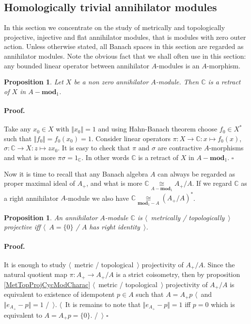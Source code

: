 \documentclass[12pt]{article}
\newcommand{\isom}[1]{\mathop{\mathbin{\cong}}\limits_{#1}}
\newtheorem{proposition}[theorem]{Proposition}
\renewenvironment{proof}{\paragraph{Proof.}}{\hfill$\square$\medskip}
\begin{document}
\subsection{Homologically trivial annihilator modules}
\label{SubSectionHomoligicallyTrivialAnnihilatorModules}

In this section we concentrate on the study of metrically and topologically projective, injective and flat annihilator modules, that is modules with zero outer action. Unless otherwise stated, all Banach spaces in this section are regarded as annihilator modules. Note the obvious fact that we shall often use in this section: any bounded linear operator between annihilator $A$-modules is an $A$-morphism.

\begin{proposition}\label{AnnihCModIsRetAnnihMod} Let $X$ be a non zero annihilator $A$-module. Then $\mathbb{C}$ is a retract of $X$ in $A-\mathbf{mod}_1$.
\end{proposition}
\begin{proof} Take any $x_0\in X$ with $\Vert x_0\Vert=1$ and using Hahn-Banach theorem choose $f_0\in X^*$ such that $\Vert f_0\Vert=f_0(x_0)=1$. Consider linear operators $\pi:X\to \mathbb{C}:x\mapsto f_0(x)$, $\sigma:\mathbb{C}\to X:z\mapsto zx_0$. It is easy to check that $\pi$ and $\sigma$ are contractive $A$-morphisms and what is more $\pi\sigma=1_\mathbb{C}$. In other words $\mathbb{C}$ is a retract of $X$ in $A-\mathbf{mod}_1$.
\end{proof}

Now it is time to recall that any Banach algebra $A$ can always be regarded as proper maximal ideal of $A_+$, and what is more $\mathbb{C}\isom{A-\mathbf{mod}_1} A_+/A$. If we regard $\mathbb{C}$ as a right annihilator $A$-module we also have $\mathbb{C}\isom{\mathbf{mod}_1-A}(A_+/A)^*$. 

\begin{proposition}\label{MetTopProjModCCharac} An annihilator $A$-module $\mathbb{C}$ is $\langle$~metrically / topologically~$\rangle$ projective iff $\langle$~$A=\{0\}$ / $A$ has right identity~$\rangle$.
\end{proposition}
\begin{proof} 
It is enough to study $\langle$~metric / topological~$\rangle$ projectivity of $A_+/A$. Since the natural quotient map $\pi:A_+\to A_+/A$ is a strict coisometry, then by proposition \ref{MetTopProjCycModCharac} $\langle$~metric / topological~$\rangle$ projectivity of $A_+/A$ is equivalent to existence of idempotent $p\in A$ such that $A=A_+p$ $\langle$~and  $\Vert e_{A_+}-p\Vert=1$ /~$\rangle$. $\langle$~It is remains to note that $\Vert e_{A_+}-p\Vert=1$ iff $p=0$ which is equivalent to $A=A_+p=\{0\}$. /~$\rangle$
\end{proof}
\end{document}
